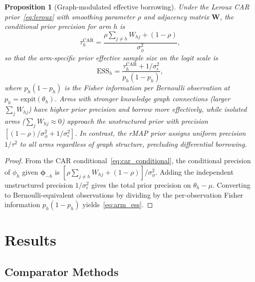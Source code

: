 \documentclass[12pt]{article}
\newtheorem{proposition}{Proposition}
\newcommand{\bphi}{\boldsymbol{\phi}}
\newcommand{\bW}{\mathbf{W}}
\begin{document}
\begin{proposition}[Graph-modulated effective borrowing]
\label{prop:ess}
Under the Leroux CAR prior~\eqref{eq:leroux} with smoothing parameter $\rho$ and adjacency matrix $\bW$, the conditional prior precision for arm $h$ is
\begin{equation}
\label{eq:arm_precision}
\tau_h^{\text{CAR}} = \frac{\rho \sum_{j \neq h} W_{hj} + (1-\rho)}{\sigma_\phi^2},
\end{equation}
so that the arm-specific prior effective sample size \citep[ESS; the number of observations the prior is worth, cf.][]{morita2008determining} on the logit scale is
\begin{equation}
\label{eq:arm_ess}
\text{ESS}_h = \frac{\tau_h^{\text{CAR}} + 1/\sigma_\epsilon^2}{p_h(1-p_h)},
\end{equation}
where $p_h(1-p_h)$ is the Fisher information per Bernoulli observation at $p_h = \text{expit}(\theta_h)$. Arms with stronger knowledge graph connections (larger $\sum_j W_{hj}$) have higher prior precision and borrow more effectively, while isolated arms ($\sum_j W_{hj} \approx 0$) approach the unstructured prior with precision $[(1-\rho)/\sigma_\phi^2 + 1/\sigma_\epsilon^2]$. In contrast, the rMAP prior assigns uniform precision $1/\tau^2$ to all arms regardless of graph structure, precluding differential borrowing.
\end{proposition}

\begin{proof}
From the CAR conditional~\eqref{eq:car_conditional}, the conditional precision of $\phi_h$ given $\bphi_{-h}$ is $[\rho \sum_{j \neq h} W_{hj} + (1-\rho)] / \sigma_\phi^2$. Adding the independent unstructured precision $1/\sigma_\epsilon^2$ gives the total prior precision on $\theta_h - \mu$. Converting to Bernoulli-equivalent observations by dividing by the per-observation Fisher information $p_h(1-p_h)$ yields~\eqref{eq:arm_ess}.
\end{proof}

\section{Results}
\label{sec:results}

\subsection{Comparator Methods}
\label{sec:comparators}
\end{document}
